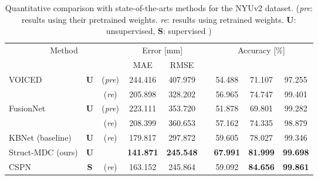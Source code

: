 \begin{table}[!t]
\centering
\renewcommand{\arraystretch}{1.10} \renewcommand{\tabcolsep}{0.8mm}  \caption{Quantitative comparison with state-of-the-arts \textcolor{color1}{methods} for the NYUv2 \textcolor{color1}{dataset}.
(\textit{pre}: results using their pretrained weights. 
\textit{re}: results using retrained weights.
\textbf{U}: unsupervised, \textbf{S}: supervised
)}


\begin{tabular}{lcccccccc}
\hline
\multicolumn{3}{c}{Method}                                       & \multicolumn{2}{c}{Error {[}mm{]} } & \multicolumn{1}{l}{} & \multicolumn{3}{c}{Accuracy {[}\%{]} }    \\ \cline{4-5} \cline{7-9} 
\multicolumn{3}{c}{}                                             & MAE                    & RMSE                   & \multicolumn{1}{l}{} &       &       &       \\ \hline
\multirow{2}{*}{\textcolor{color2}{VOICED~\cite{void}}}             & \multirow{2}{*}{\textbf{U}} & (\textit{pre}) & 244.416                & 407.979                &                      & 54.488          & 71.107          & 97.255          \\
                                    &                    & (\textit{re})  & 205.898                & 328.202                &                      & 56.965          & 74.747          & 99.401          \\
\multirow{2}{*}{\textcolor{color2}{FusionNet~\cite{learning_top}}} & \multirow{2}{*}{\textbf{U}} & (\textit{pre}) & 223.111                & 353.720                &                      & 51.878          & 69.801          & 99.282          \\
                                    &                    & (\textit{re})  & 208.399                & 360.653                &                      & 57.162          & 74.335          & 98.879          \\
\textcolor{color2}{KBNet (baseline)~\cite{baseline}}                    & \textbf{U}                  & (\textit{re})  & 179.817                & 297.872                &                      & 59.605          & 78.027          & 99.346          \\
Struct-MDC (ours)                                & \textbf{U}                  &       & \textbf{141.871}       & \textbf{245.548}       &                      & \textbf{67.991} & \textbf{81.999} & \textbf{99.698} \\ \hline
\textcolor{color2}{CSPN~\cite{cspn}}                                & \textbf{S}                  & (\textit{re})  & 163.152                & 245.864                &                      & 59.092          & \textbf{84.656} & \textbf{99.861} \\ \hline
\end{tabular}


\label{table:exp_nyu}
\end{table}


